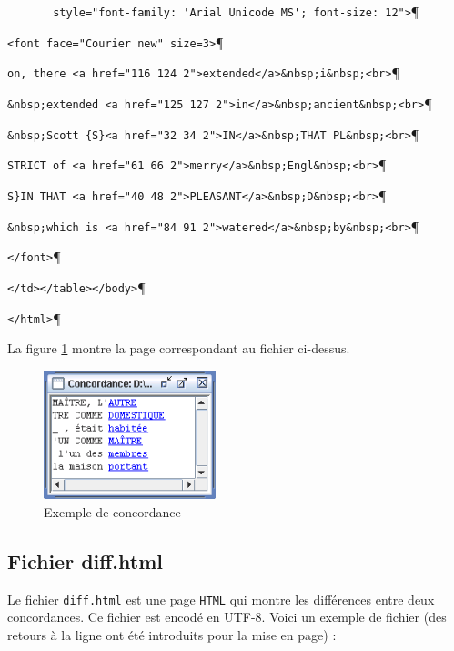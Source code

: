 \verb$       style="font-family: 'Arial Unicode MS'; font-size: 12">$\P

\verb$<font face="Courier new" size=3>$\P

\verb$on, there <a href="116 124 2">extended</a>&nbsp;i&nbsp;<br>$\P

\verb$&nbsp;extended <a href="125 127 2">in</a>&nbsp;ancient&nbsp;<br>$\P

\verb$&nbsp;Scott {S}<a href="32 34 2">IN</a>&nbsp;THAT PL&nbsp;<br>$\P

\verb$STRICT of <a href="61 66 2">merry</a>&nbsp;Engl&nbsp;<br>$\P

\verb+S}IN THAT <a href="40 48 2">PLEASANT</a>&nbsp;D&nbsp;<br>+\P

\verb+&nbsp;which is <a href="84 91 2">watered</a>&nbsp;by&nbsp;<br>+\P

\verb$</font>$\P

\verb$</td></table></body>$\P

\verb$</html>$\P


\bigskip
\noindent La figure \ref{fig-example-concordance-2} montre la page correspondant au fichier
ci-dessus.

\begin{figure}[!ht]
\begin{center}
\includegraphics[width=5cm]{resources/img/fig10-2.png}
\caption{Exemple de concordance \label{fig-example-concordance-2}}
\end{center}
\end{figure}



\subsection{Fichier diff.html}
Le fichier \verb+diff.html+ est une page \verb+HTML+ qui montre les différences entre deux concordances. Ce fichier est encodé en UTF-8. Voici un exemple de fichier (des retours à la ligne ont été introduits pour la mise en page) :



